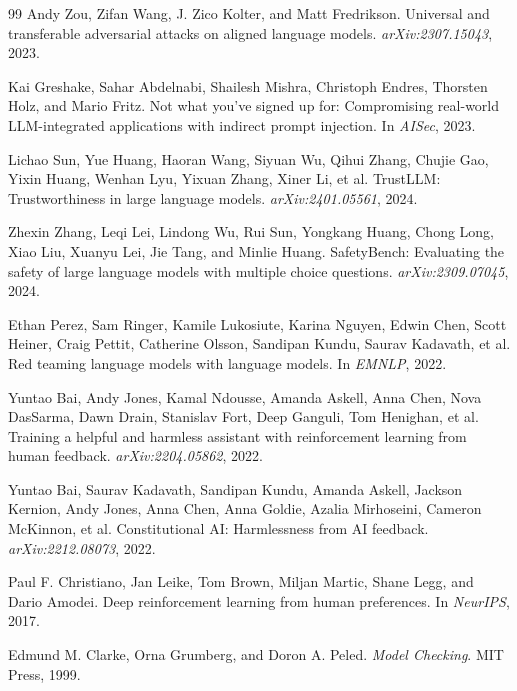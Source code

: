 \documentclass{article}
\begin{document}
\begin{thebibliography}{99}
Andy Zou, Zifan Wang, J. Zico Kolter, and Matt Fredrikson.
\newblock Universal and transferable adversarial attacks on aligned language models.
\newblock \emph{arXiv:2307.15043}, 2023.

Kai Greshake, Sahar Abdelnabi, Shailesh Mishra, Christoph Endres, Thorsten Holz, and Mario Fritz.
\newblock Not what you've signed up for: Compromising real-world LLM-integrated applications with indirect prompt injection.
\newblock In \emph{AISec}, 2023.

Lichao Sun, Yue Huang, Haoran Wang, Siyuan Wu, Qihui Zhang, Chujie Gao, Yixin Huang, Wenhan Lyu, Yixuan Zhang, Xiner Li, et al.
\newblock TrustLLM: Trustworthiness in large language models.
\newblock \emph{arXiv:2401.05561}, 2024.

Zhexin Zhang, Leqi Lei, Lindong Wu, Rui Sun, Yongkang Huang, Chong Long, Xiao Liu, Xuanyu Lei, Jie Tang, and Minlie Huang.
\newblock SafetyBench: Evaluating the safety of large language models with multiple choice questions.
\newblock \emph{arXiv:2309.07045}, 2024.

Ethan Perez, Sam Ringer, Kamile Lukosiute, Karina Nguyen, Edwin Chen, Scott Heiner, Craig Pettit, Catherine Olsson, Sandipan Kundu, Saurav Kadavath, et al.
\newblock Red teaming language models with language models.
\newblock In \emph{EMNLP}, 2022.

Yuntao Bai, Andy Jones, Kamal Ndousse, Amanda Askell, Anna Chen, Nova DasSarma, Dawn Drain, Stanislav Fort, Deep Ganguli, Tom Henighan, et al.
\newblock Training a helpful and harmless assistant with reinforcement learning from human feedback.
\newblock \emph{arXiv:2204.05862}, 2022.

Yuntao Bai, Saurav Kadavath, Sandipan Kundu, Amanda Askell, Jackson Kernion, Andy Jones, Anna Chen, Anna Goldie, Azalia Mirhoseini, Cameron McKinnon, et al.
\newblock Constitutional AI: Harmlessness from AI feedback.
\newblock \emph{arXiv:2212.08073}, 2022.

Paul F. Christiano, Jan Leike, Tom Brown, Miljan Martic, Shane Legg, and Dario Amodei.
\newblock Deep reinforcement learning from human preferences.
\newblock In \emph{NeurIPS}, 2017.

Edmund M. Clarke, Orna Grumberg, and Doron A. Peled.
\newblock \emph{Model Checking}.
\newblock MIT Press, 1999.


\end{thebibliography}
\end{document}
